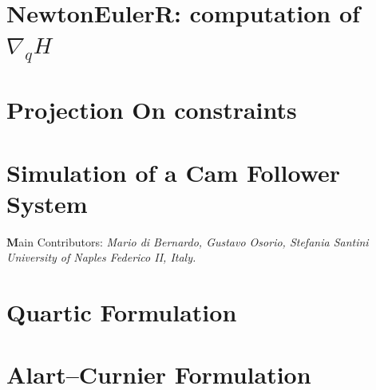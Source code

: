 \documentclass[10pt]{report}
\begin{document}
\chapter{NewtonEulerR: computation of $\nabla _qH$}

\chapter{Projection On constraints}


%  


\chapter{Simulation of a Cam Follower System}
{\textbf Main Contributors:} {\textit{Mario di Bernardo, Gustavo Osorio, Stefania Santini}}\\
\textit{University of Naples Federico II, Italy.}\\


\chapter{Quartic Formulation}



\chapter{Alart--Curnier Formulation}




\end{document}
